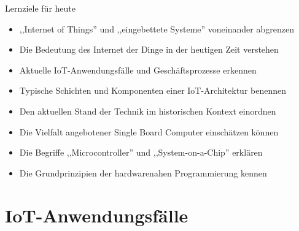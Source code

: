 \begin{frame}{Lernziele für heute}
    \begin{itemize}
        \item ,,Internet of Things'' und ,,eingebettete Systeme'' voneinander abgrenzen
        \item Die Bedeutung des Internet der Dinge in der heutigen Zeit verstehen
        \item Aktuelle IoT-Anwendungsfälle und Geschäftsprozesse erkennen
        \item Typische Schichten und Komponenten einer IoT-Architektur benennen
        \item Den aktuellen Stand der Technik im historischen Kontext einordnen
        \item Die Vielfalt angebotener Single Board Computer einschätzen können
        \item Die Begriffe ,,Microcontroller'' und ,,System-on-a-Chip'' erklären
        \item Die Grundprinzipien der hardwarenahen Programmierung kennen
    \end{itemize}
\end{frame}

\section{IoT-Anwendungsfälle}

